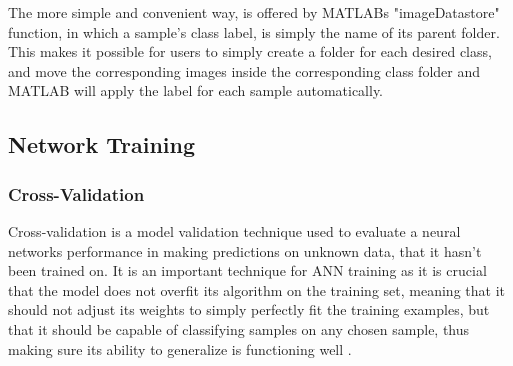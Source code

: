 The more simple and convenient way, is offered by MATLABs "imageDatastore" function, in which a sample's class label, is simply the name of its parent folder. This makes it possible for users to simply create a folder for each desired class, and move the corresponding images inside the corresponding class folder and MATLAB will apply the label for each sample automatically.


\subsection{Network Training}

\subsubsection{Cross-Validation}
Cross-validation is a model validation technique used to evaluate a neural networks performance in making predictions on unknown data, that it hasn't been trained on. It is an important technique for ANN training as it is crucial that the model does not overfit its algorithm on the training set, meaning that it should not adjust its weights to simply perfectly fit the training examples, but that it should be capable of classifying samples on any chosen sample, thus making sure its ability to generalize is functioning well \cite{matlab:cv}.

